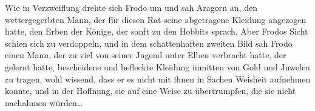 Wie in Verzweiflung drehte sich Frodo um und sah Aragorn an, den wettergegerbten Mann, der für diesen Rat seine abgetragene Kleidung angezogen hatte, den Erben der Könige, der sanft zu den Hobbits sprach. Aber Frodos Sicht schien sich zu verdoppeln, und in dem schattenhaften zweiten Bild sah Frodo einen Mann, der zu viel von seiner Jugend unter Elben verbracht hatte, der gelernt hatte, bescheidene und befleckte Kleidung inmitten von Gold und Juwelen zu tragen, wohl wissend, dass er es nicht mit ihnen in Sachen Weisheit aufnehmen konnte, und in der Hoffnung, sie auf eine Weise zu übertrumpfen, die sie nicht nachahmen würden…

